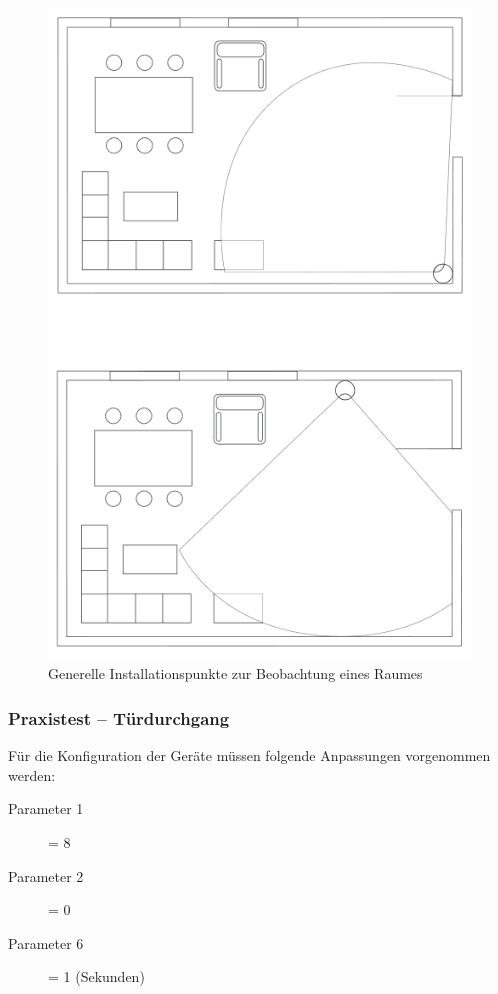 \begin{figure}[h!]
	\centering
	\includegraphics[scale=0.4]{img/Sensorevaluation/FibaroMultiExamples.png}
	\caption{Generelle Installationspunkte zur Beobachtung eines Raumes}
	\label{fig:sensorenFibaroMultiExamples}
\end{figure}

\subsubsection{Praxistest – Türdurchgang}
Für die Konfiguration der Geräte müssen folgende Anpassungen vorgenommen werden:
\begin{description}
	\item [Parameter 1] = 8
	\item [Parameter 2] = 0
	\item [Parameter 6] = 1 (Sekunden)
	
\end{description}

